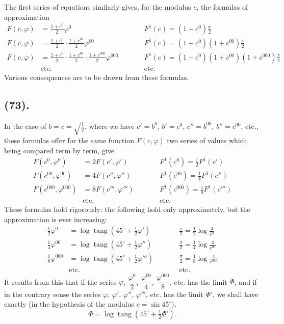 \documentclass{article}
\begin{document}
The first series of equations similarly gives, for the modulus $c$, the formulas of approximation
\[ \begin{aligned} F(c,\varphi)&=\frac{1+c^{0}}{2}\varphi^{0} &\qquad& F^{1}(c)=(1+c^{0})\frac{\pi}{2}\\ F(c,\varphi)&=\frac{1+c^{0}}{2}\cdot\frac{1+c^{00}}{2}\varphi^{00} && F^{1}(c)=(1+c^{0})(1+c^{00})\frac{\pi}{2}\\ F(c,\varphi)&=\frac{1+c^{0}}{2}\cdot\frac{1+c^{00}}{2}\cdot\frac{1+c^{000}}{2}\varphi^{000} && F^{1}(c)=(1+c^{0})(1+c^{00})(1+c^{000})\frac{\pi}{2}\\ &\text{etc.} && \text{etc.} \end{aligned} \]
Various consequences are to be drawn from these formulas.

\subsection*{(73).}

In the case of $b=c=\sqrt{\frac{1}{2}}$, where we have $c'=b^{0}$, $b'=c^{0}$, $c''=b^{00}$, $b''=c^{00}$, etc., these formulas offer for the same function $F(c,\varphi)$ two series of values which, being compared term by term, give
\[ \begin{aligned} F(c^{0},\varphi^{0})&=2F(c',\varphi') &\qquad& F^{1}(c^{0})=\tfrac{1}{2}F^{1}(c')\\ F(c^{00},\varphi^{00})&=4F(c'',\varphi'') && F^{1}(c^{00})=\tfrac{1}{4}F^{1}(c'')\\ F(c^{000},\varphi^{000})&=8F(c''',\varphi''') && F^{1}(c^{000})=\tfrac{1}{8}F^{1}(c''')\\ &\text{etc.} && \text{etc.} \end{aligned} \]
These formulas hold rigorously: the following hold only approximately, but the approximation is ever increasing:
\[ \begin{aligned} \tfrac{1}{2}\varphi^{0}&=\log\operatorname{tang}(45^{\circ}+\tfrac{1}{2}\varphi') &\qquad& \frac{\pi}{2}=\tfrac{1}{2}\log\frac{4}{c^{0}}\\ \tfrac{1}{4}\varphi^{00}&=\log\operatorname{tang}(45^{\circ}+\tfrac{1}{2}\varphi'') && \frac{\pi}{2}=\tfrac{1}{4}\log\frac{4}{c^{00}}\\ \tfrac{1}{8}\varphi^{000}&=\log\operatorname{tang}(45^{\circ}+\tfrac{1}{2}\varphi''') && \frac{\pi}{2}=\tfrac{1}{8}\log\frac{4}{c^{000}}\\ &\text{etc.} && \text{etc.} \end{aligned} \]
It results from this that if the series $\varphi$, $\dfrac{\varphi^{0}}{2}$, $\dfrac{\varphi^{00}}{4}$, $\dfrac{\varphi^{000}}{8}$, etc. has the limit $\Phi$, and if in the contrary sense the series $\varphi$, $\varphi'$, $\varphi''$, $\varphi'''$, etc. has the limit $\Phi'$, we shall have exactly (in the hypothesis of the modulus $c=\sin45^{\circ}$),
\[ \Phi=\log\operatorname{tang}(45^{\circ}+\tfrac{1}{2}\Phi'). \]
\end{document}
